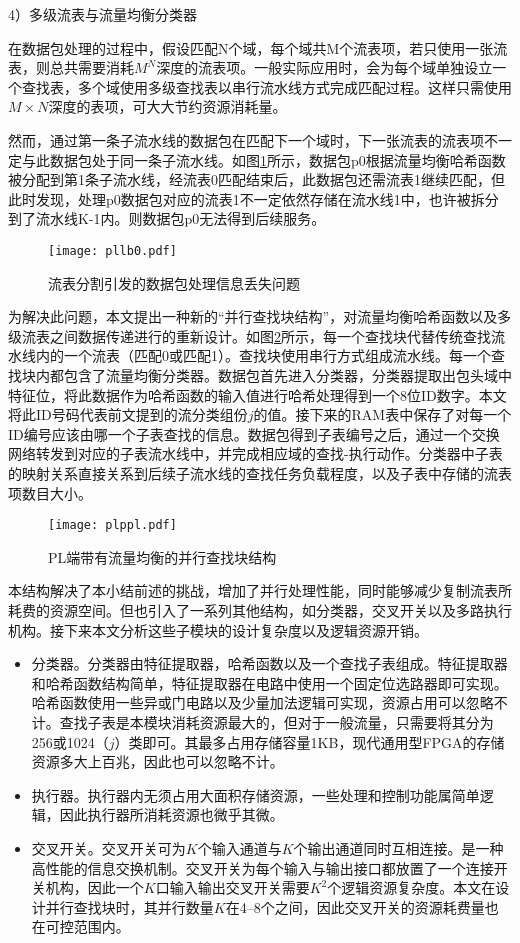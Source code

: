 4）多级流表与流量均衡分类器

在数据包处理的过程中，假设匹配N个域，每个域共M个流表项，若只使用一张流表，则总共需要消耗$ M^N $深度的流表项。一般实际应用时，会为每个域单独设立一个查找表，多个域使用多级查找表以串行流水线方式完成匹配过程。这样只需使用$M\times N$深度的表项，可大大节约资源消耗量。

然而，通过第一条子流水线的数据包在匹配下一个域时，下一张流表的流表项不一定与此数据包处于同一条子流水线。如图\ref{fig:pllb0}所示，数据包p0根据流量均衡哈希函数被分配到第1条子流水线，经流表0匹配结束后，此数据包还需流表1继续匹配，但此时发现，处理p0数据包对应的流表1不一定依然存储在流水线1中，也许被拆分到了流水线K-1内。则数据包p0无法得到后续服务。

\begin{figure}[!ht]
	\centering 
	\texttt{[image: pllb0.pdf]}
	\caption{流表分割引发的数据包处理信息丢失问题} \label{fig:pllb0}
\end{figure}

为解决此问题，本文提出一种新的“并行查找块结构”，对流量均衡哈希函数以及多级流表之间数据传递进行的重新设计。如图\ref{fig:plppl}所示，每一个查找块代替传统查找流水线内的一个流表（匹配0或匹配1）。查找块使用串行方式组成流水线。每一个查找块内都包含了流量均衡分类器。数据包首先进入分类器，分类器提取出包头域中特征位，将此数据作为哈希函数的输入值进行哈希处理得到一个8位ID数字。本文将此ID号码代表前文提到的流分类组份$ j $的值。接下来的RAM表中保存了对每一个ID编号应该由哪一个子表查找的信息。数据包得到子表编号之后，通过一个交换网络转发到对应的子表流水线中，并完成相应域的查找-执行动作。分类器中子表的映射关系直接关系到后续子流水线的查找任务负载程度，以及子表中存储的流表项数目大小。

\begin{figure}[!ht]
	\centering 
	\texttt{[image: plppl.pdf]}
	\caption{PL端带有流量均衡的并行查找块结构} \label{fig:plppl}
\end{figure}

本结构解决了本小结前述的挑战，增加了并行处理性能，同时能够减少复制流表所耗费的资源空间。但也引入了一系列其他结构，如分类器，交叉开关以及多路执行机构。接下来本文分析这些子模块的设计复杂度以及逻辑资源开销。


\begin{itemize}
	\item 分类器。分类器由特征提取器，哈希函数以及一个查找子表组成。特征提取器和哈希函数结构简单，特征提取器在电路中使用一个固定位选路器即可实现。哈希函数使用一些异或门电路以及少量加法逻辑可实现，资源占用可以忽略不计。查找子表是本模块消耗资源最大的，但对于一般流量，只需要将其分为256或1024（$j$）类即可。其最多占用存储容量1KB，现代通用型FPGA的存储资源多大上百兆，因此也可以忽略不计。
	\item 执行器。执行器内无须占用大面积存储资源，一些处理和控制功能属简单逻辑，因此执行器所消耗资源也微乎其微。
	\item 交叉开关。交叉开关可为$ K $个输入通道与$ K $个输出通道同时互相连接。是一种高性能的信息交换机制。交叉开关为每个输入与输出接口都放置了一个连接开关机构，因此一个$ K $口输入输出交叉开关需要$K^2$个逻辑资源复杂度。本文在设计并行查找块时，其并行数量$ K $在4--8个之间，因此交叉开关的资源耗费量也在可控范围内。
\end{itemize}

